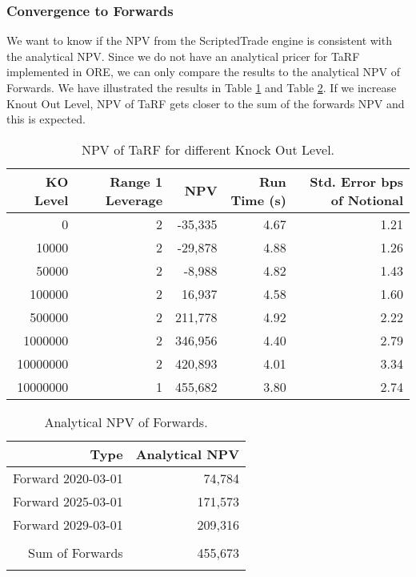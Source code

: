 \subsubsection{Convergence to Forwards}
We want to know if the NPV from the ScriptedTrade engine is consistent with the analytical NPV.
Since we do not have an analytical pricer for TaRF implemented in ORE, we can only compare
the results to the analytical NPV of Forwards. We have illustrated the results in
Table \ref{tarf_npv_ko_level_convergence} and Table \ref{tarf_analytical_npv}. If we increase
Knout Out Level, NPV of TaRF gets closer to the sum of the forwards NPV and this is expected.

\begin{table}[!htbp]
  \centering
  \begin{tabular}{r | r | r | r | r}
    KO Level & Range 1 Leverage & NPV & Run Time (s) & Std. Error bps of Notional \\ \hline
    0 & 2 & -35,335 & 4.67 & 1.21 \\
    10000 & 2 & -29,878 & 4.88 & 1.26 \\
    50000 & 2 & -8,988 & 4.82 & 1.43 \\
    100000 & 2 & 16,937 & 4.58 & 1.60 \\
    500000 & 2 & 211,778 & 4.92 & 2.22 \\
    1000000 & 2 & 346,956 & 4.40 & 2.79 \\
    10000000 & 2 & 420,893 & 4.01 & 3.34 \\
    10000000 & 1 & 455,682 & 3.80 & 2.74 \\
  \end{tabular}
  \caption{NPV of TaRF for different Knock Out Level.}
  \label{tarf_npv_ko_level_convergence}
\end{table}

\begin{table}[!htbp]
  \centering
  \begin{tabular}{r | r}
    Type & Analytical NPV \\ \hline
    Forward 2020-03-01 & 74,784 \\
    Forward 2025-03-01 & 171,573\\
    Forward 2029-03-01 & 209,316 \\ \hline \\
    Sum of Forwards & 455,673 \\ \hline \\
  \end{tabular}
  \caption{Analytical NPV of Forwards.}
  \label{tarf_analytical_npv}
\end{table}